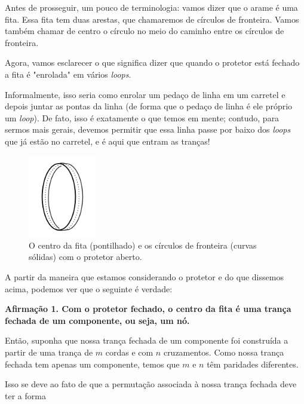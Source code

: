 \documentclass[a4paper,portuguese,11pt,twoside, leqno]{book}
\theoremstyle{definition}
\begin{document}
	\par\vspace{0.3cm} Antes de prosseguir, um pouco de terminologia: vamos dizer que o arame é uma fita. Essa fita tem duas arestas, que chamaremos de círculos de fronteira. Vamos também chamar de centro o círculo no meio do caminho entre os círculos de fronteira. 
	\par\vspace{0.3cm} Agora, vamos esclarecer o que significa dizer que quando o protetor está fechado a fita é "enrolada" em vários \textit{loops}.
	\par\vspace{0.3cm} Informalmente, isso seria como enrolar um pedaço de linha em um carretel e depois juntar as pontas da linha (de forma que o pedaço de linha é ele próprio um \textit{loop}). De fato, isso é exatamente o que temos em mente; contudo, para sermos mais gerais, devemos permitir que essa linha passe por baixo dos \textit{loops} que já estão no carretel, e é aqui que entram as tranças! 
	\begin{figure}[H]
		\begin{center}
			\includegraphics[width=3cm]{Images/fita.png}
		\end{center}\caption{O centro da fita (pontilhado) e os círculos de fronteira (curvas sólidas) com o protetor aberto.}
	\end{figure}
	\par\vspace{0.3cm} A partir da maneira que estamos considerando o protetor e do que dissemos acima, podemos ver que o seguinte é verdade:
	\begin{center}
		\textbf{Afirmação 1. Com o protetor fechado, o centro da fita é uma trança fechada de um componente, ou seja, um nó.}
	\end{center}
	\par\vspace{0.3cm} Então, suponha que nossa trança fechada de um componente foi construída a partir de uma trança de $m$ cordas e com $n$ cruzamentos. Como nossa trança fechada tem apenas um componente, temos que $m$ e $n$ têm paridades diferentes.
	\par\vspace{0.3cm} Isso se deve ao fato de que a permutação associada à nossa trança fechada deve ter a forma
\end{document}
